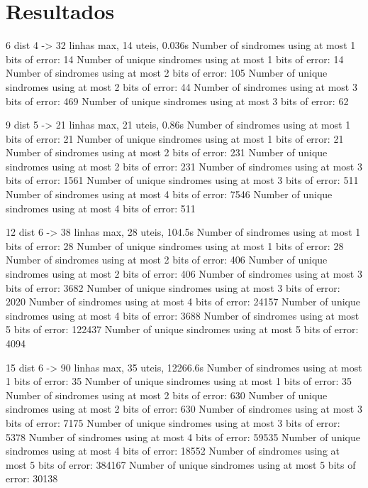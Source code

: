 \section{Resultados}
6 dist 4 -> 32 linhas max, 14 uteis, 0.036s
Number of sindromes using at most 1 bits of error:  14
Number of unique sindromes using at most 1 bits of error:  14
Number of sindromes using at most 2 bits of error:  105
Number of unique sindromes using at most 2 bits of error:  44
Number of sindromes using at most 3 bits of error:  469
Number of unique sindromes using at most 3 bits of error:  62

9 dist 5 -> 21 linhas max, 21 uteis, 0.86s
Number of sindromes using at most 1 bits of error:  21
Number of unique sindromes using at most 1 bits of error:  21
Number of sindromes using at most 2 bits of error:  231
Number of unique sindromes using at most 2 bits of error:  231
Number of sindromes using at most 3 bits of error:  1561
Number of unique sindromes using at most 3 bits of error:  511
Number of sindromes using at most 4 bits of error:  7546
Number of unique sindromes using at most 4 bits of error:  511

12 dist 6 -> 38 linhas max, 28 uteis, 104.5s
Number of sindromes using at most 1 bits of error:  28
Number of unique sindromes using at most 1 bits of error:  28
Number of sindromes using at most 2 bits of error:  406
Number of unique sindromes using at most 2 bits of error:  406
Number of sindromes using at most 3 bits of error:  3682
Number of unique sindromes using at most 3 bits of error:  2020
Number of sindromes using at most 4 bits of error:  24157
Number of unique sindromes using at most 4 bits of error:  3688
Number of sindromes using at most 5 bits of error:  122437
Number of unique sindromes using at most 5 bits of error:  4094

15 dist 6 -> 90 linhas max, 35 uteis, 12266.6s
Number of sindromes using at most 1 bits of error:  35
Number of unique sindromes using at most 1 bits of error:  35
Number of sindromes using at most 2 bits of error:  630
Number of unique sindromes using at most 2 bits of error:  630
Number of sindromes using at most 3 bits of error:  7175
Number of unique sindromes using at most 3 bits of error:  5378
Number of sindromes using at most 4 bits of error:  59535
Number of unique sindromes using at most 4 bits of error:  18552
Number of sindromes using at most 5 bits of error:  384167
Number of unique sindromes using at most 5 bits of error:  30138